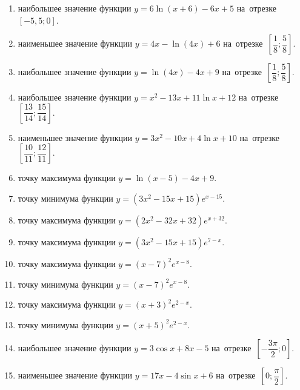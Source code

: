 \documentclass[a4paper,10pt]{article}
\begin{document}
\begin{enumerate}
\item {} наибольшее значение функции $y=6\ln \left(x+6\right)-6x+5$ на~отрезке~$\left[-5,5;0\right]$.

\item {} наименьшее значение функции $y=4x-\ln \left(4x\right)+6$ на~отрезке~$\left[\dfrac{1}{8};\dfrac{5}{8}\right]$.

\item {} наибольшее значение функции $y=\ln \left(4x\right)-4x+9$ на~отрезке~$\left[\dfrac{1}{8};\dfrac{5}{8}\right]$.

\item {} наибольшее значение функции $y=x^2-13x+11\ln x+12$ на~отрезке~$\left[\dfrac{13}{14};\dfrac{15}{14}\right]$.

\item {} наименьшее значение функции $y=3x^2-10x+4\ln x+10$ на~отрезке~$\left[\dfrac{10}{11};\dfrac{12}{11}\right]$.

\item {} точку максимума функции $y=\ln \left(x-5\right)-4x+9$.

\item {} точку минимума функции $y=\left(3x^2-15x+15\right)e^{x-15}$.

\item {} точку максимума функции $y=\left(2x^2-32x+32\right)e^{x+32}$.

\item {} точку максимума функции $y=\left(3x^2-15x+15\right)e^{7-x}$.

\item {} точку максимума функции $y=\left(x-7\right)^2e^{x-8}$.

\item {} точку минимума функции $y=\left(x-7\right)^2e^{x-8}$.

\item {} точку максимума функции $y=\left(x+3\right)^2e^{2-x}$.

\item {} точку минимума функции $y=\left(x+5\right)^2e^{2-x}$.

\item {} наибольшее значение функции $y=3\cos x+8x-5$ на~отрезке~$\left[-\dfrac{3\pi }{2};0\right]$.

\item {} наименьшее значение функции $y=17x-4\sin x+6$ на~отрезке~$\left[0;\dfrac{\pi }{2}\right]$.


\end{enumerate}
\end{document}
